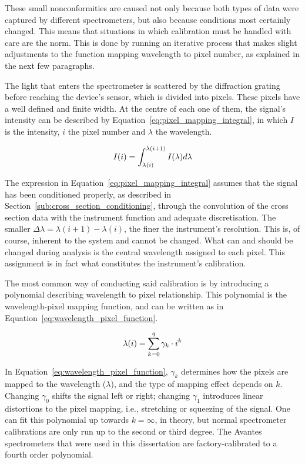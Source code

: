 These small nonconformities are caused not only because both types of
data were captured by different spectrometers, but also because
conditions most certainly changed. This means that situations in which
calibration must be handled with care are the norm. This is done by
running an iterative process that makes slight adjustments to the
function mapping wavelength to pixel number, as explained in the next
few paragraphs.

The light that enters the spectrometer is scattered by the diffraction
grating before reaching the device's sensor, which is divided into
pixels. These pixels have a well defined and finite width. At the centre
of each one of them, the signal's intensity can be described by
Equation~\ref{eq:pixel_mapping_integral}, in which $I$ is the intensity,
$i$ the pixel number and $\lambda$ the wavelength.

\begin{equation}
    \centering
    I(i) = \int_{\lambda(i)}^{\lambda(i+1)} I(\lambda)d{\lambda}
    \label{eq:pixel_mapping_integral}
\end{equation}

The expression in Equation~\ref{eq:pixel_mapping_integral} assumes that
the signal has been conditioned properly, as described in
Section~\ref{sub:cross_section_conditioning}, through the convolution of
the cross section data with the instrument function and adequate
discretisation. The smaller $\Delta \lambda = \lambda(i+1)-\lambda(i)$,
the finer the instrument's resolution. This is, of course, inherent to
the system and cannot be changed. What can and should be changed during
analysis is the central wavelength assigned to each pixel. This
assignment is in fact what constitutes the instrument's calibration.

The most common way of conducting said calibration is by introducing a
polynomial describing wavelength to pixel relationship. This polynomial
is the wavelength-pixel mapping function, and can be written as in
Equation~\ref{eq:wavelength_pixel_function}.

\begin{equation}
    \centering
    \lambda(i) = \sum_{k=0}^{q} \gamma_{k} \cdot i^k
    \label{eq:wavelength_pixel_function}
\end{equation}

In Equation~\ref{eq:wavelength_pixel_function}, $\gamma_{k}$ determines
how the pixels are mapped to the wavelength ($\lambda$), and the type of
mapping effect depends on $k$. Changing $\gamma_{0}$ shifts the signal
left or right; changing $\gamma_{1}$ introduces linear distortions to
the pixel mapping, i.e., stretching or squeezing of the signal. One can
fit this polynomial up towards $k=\infty$, in theory, but normal
spectrometer calibrations are only run up to the second or third degree.
The Avantes spectrometers that were used in this dissertation are
factory-calibrated to a fourth order polynomial. 

